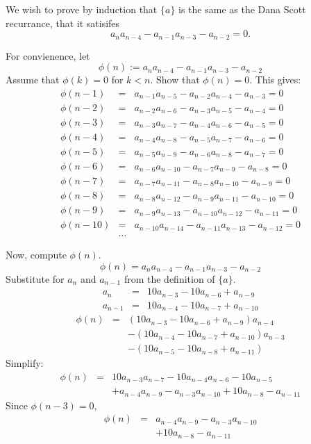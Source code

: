 \documentclass[10pt]{article}
\begin{document}
We wish to prove by induction that $\{a\}$ is the same as the Dana
Scott recurrance, that it satisifes 
\[     	a_n a_{n-4} - a_{n-1} a_{n-3} - a_{n-2} = 0.	\]

For convienence, let 
\[	\phi(n) := a_n a_{n-4} - a_{n-1} a_{n-3} - a_{n-2}	\]
Assume that $\phi(k)=0$ for $k < n$.  Show that $\phi(n) = 0$.
This gives:
\begin{eqnarray*}
	\phi(n-1) & =& a_{n-1} a_{n-5} - a_{n-2} a_{n-4} - a_{n-3} = 0 \\
	\phi(n-2) & =& a_{n-2} a_{n-6} - a_{n-3} a_{n-5} - a_{n-4} = 0\\
	\phi(n-3) & =& a_{n-3} a_{n-7} - a_{n-4} a_{n-6} - a_{n-5} = 0\\
	\phi(n-4) & =& a_{n-4} a_{n-8} - a_{n-5} a_{n-7} - a_{n-6} = 0\\
	\phi(n-5) & =& a_{n-5} a_{n-9} - a_{n-6} a_{n-8} - a_{n-7} = 0\\
	\phi(n-6) & =& a_{n-6} a_{n-10} - a_{n-7} a_{n-9} - a_{n-8} = 0\\
	\phi(n-7) & =& a_{n-7} a_{n-11} - a_{n-8} a_{n-10} - a_{n-9} = 0\\
	\phi(n-8) & =& a_{n-8} a_{n-12} - a_{n-9} a_{n-11} - a_{n-10} = 0\\
	\phi(n-9) & =& a_{n-9} a_{n-13} - a_{n-10} a_{n-12} - a_{n-11} = 0\\
	\phi(n-10)& =& a_{n-10} a_{n-14} - a_{n-11} a_{n-13} - a_{n-12} = 0\\
	& \ldots &
\end{eqnarray*}


Now, compute $\phi(n)$.
\[	\phi(n) = a_{n}  a_{n-4} -  a_{n-1}  a_{n-3} - a_{n-2} \]
Substitute for $a_{n}$ and $a_{n-1}$ from the definition of $\{a\}$.
\begin{eqnarray*}
	a_{n}   &=& 10  a_{n-3} - 10  a_{n-6} + a_{n-9} \\
	a_{n-1}	&=& 10  a_{n-4} - 10  a_{n-7} + a_{n-10} 
\end{eqnarray*}
\begin{eqnarray*}
\phi(n) &=&   ( 10  a_{n-3} - 10  a_{n-6} + a_{n-9}  )  a_{n-4}\\
        && - ( 10  a_{n-4} - 10  a_{n-7} + a_{n-10} )   a_{n-3} \\
	&& - ( 10  a_{n-5} - 10  a_{n-8} + a_{n-11} ) 
\end{eqnarray*}
Simplify:
\begin{eqnarray*}
	\phi(n) &=&  10 a_{n - 3} a_{n - 7} - 10 a_{n - 4} a_{n - 6} - 10 a_{n - 5} \\
		&&+ a_{n - 4} a_{n - 9} - a_{n - 3} a_{n - 10} + 10 a_{n - 8} - a_{n - 11}
\end{eqnarray*}
Since $\phi(n-3)=0$, 
\begin{eqnarray*}
	\phi(n) &=&  a_{n - 4} a_{n - 9}  - a_{n - 3} a_{n - 10}\\ 
		&& + 10 a_{n - 8}  - a_{n - 11}
\end{eqnarray*}
\end{document}
